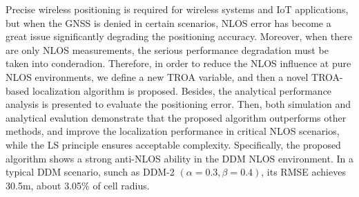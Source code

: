 \documentclass[journal]{IEEEtran}
\begin{document}
Precise wireless positioning is required for wireless systems and IoT applications, but when the GNSS is denied in certain scenarios, NLOS error has become a great issue significantly degrading the positioning accuracy. Moreover, when there are only NLOS measurements, the serious performance degradation must be taken into conderadion. Therefore, in order to reduce the NLOS influence at pure NLOS environments, we define a new TROA variable, and then a novel TROA-based localization algorithm is proposed. Besides, the analytical performance analysis is presented to evaluate the positioning error. Then, both simulation and analytical evalution demonstrate that the proposed algorithm outperforms other methods, and improve the localization performance in critical NLOS scenarios, while the LS principle ensures acceptable complexity. Specifically, the proposed algorithm shows a strong anti-NLOS ability in the DDM NLOS environment. In a typical DDM scenario, sunch as DDM-2 $\left({\alpha} = 0.3, {\beta} = 0.4\right)$, its RMSE achieves 30.5m, about 3.05\% of cell radius.

%


\end{document}
